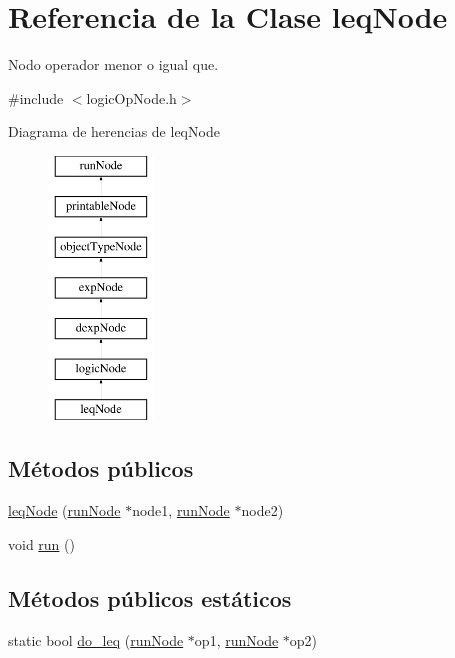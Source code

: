 \hypertarget{classleqNode}{\section{Referencia de la Clase leq\-Node}
\label{classleqNode}
}


Nodo operador menor o igual que.  




{\ttfamily \#include $<$logic\-Op\-Node.\-h$>$}

Diagrama de herencias de leq\-Node\begin{figure}[H]
\begin{center}
\leavevmode
\includegraphics[height=7.000000cm]{classleqNode}
\end{center}
\end{figure}
\subsection*{Métodos públicos}
\begin{DoxyCompactItemize}
\item 
\hyperlink{classleqNode_abfe79d9af2fd8a199a96c17a08a22e36}{leq\-Node} (\hyperlink{classrunNode}{run\-Node} $\ast$node1, \hyperlink{classrunNode}{run\-Node} $\ast$node2)
\item 
void \hyperlink{classleqNode_a8805e035c0562e4b8974f9ebb346abe5}{run} ()
\end{DoxyCompactItemize}
\subsection*{Métodos públicos estáticos}
\begin{DoxyCompactItemize}
\item 
static bool \hyperlink{classleqNode_a12df6891986dfe4367b7740388e0039e}{do\-\_\-leq} (\hyperlink{classrunNode}{run\-Node} $\ast$op1, \hyperlink{classrunNode}{run\-Node} $\ast$op2)
\end{DoxyCompactItemize}
